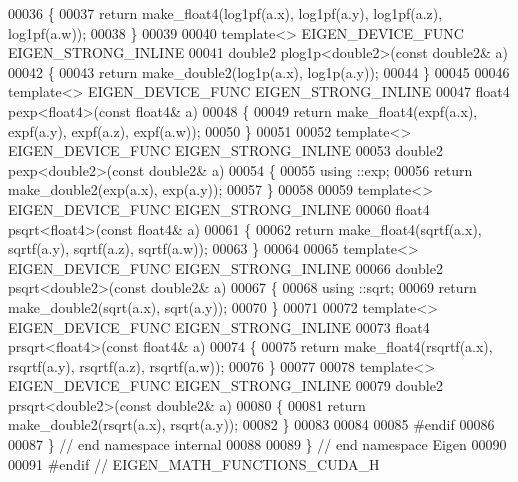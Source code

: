 \begin{DoxyCode}
00036 \{
00037   \textcolor{keywordflow}{return} make\_float4(log1pf(a.x), log1pf(a.y), log1pf(a.z), log1pf(a.w));
00038 \}
00039 
00040 \textcolor{keyword}{template}<>  EIGEN\_DEVICE\_FUNC EIGEN\_STRONG\_INLINE
00041 double2 plog1p<double2>(\textcolor{keyword}{const} double2& a)
00042 \{
00043   \textcolor{keywordflow}{return} make\_double2(log1p(a.x), log1p(a.y));
00044 \}
00045 
00046 \textcolor{keyword}{template}<> EIGEN\_DEVICE\_FUNC EIGEN\_STRONG\_INLINE
00047 float4 pexp<float4>(\textcolor{keyword}{const} float4& a)
00048 \{
00049   \textcolor{keywordflow}{return} make\_float4(expf(a.x), expf(a.y), expf(a.z), expf(a.w));
00050 \}
00051 
00052 \textcolor{keyword}{template}<> EIGEN\_DEVICE\_FUNC EIGEN\_STRONG\_INLINE
00053 double2 pexp<double2>(\textcolor{keyword}{const} double2& a)
00054 \{
00055   using ::exp;
00056   \textcolor{keywordflow}{return} make\_double2(exp(a.x), exp(a.y));
00057 \}
00058 
00059 \textcolor{keyword}{template}<> EIGEN\_DEVICE\_FUNC EIGEN\_STRONG\_INLINE
00060 float4 psqrt<float4>(\textcolor{keyword}{const} float4& a)
00061 \{
00062   \textcolor{keywordflow}{return} make\_float4(sqrtf(a.x), sqrtf(a.y), sqrtf(a.z), sqrtf(a.w));
00063 \}
00064 
00065 \textcolor{keyword}{template}<> EIGEN\_DEVICE\_FUNC EIGEN\_STRONG\_INLINE
00066 double2 psqrt<double2>(\textcolor{keyword}{const} double2& a)
00067 \{
00068   using ::sqrt;
00069   \textcolor{keywordflow}{return} make\_double2(sqrt(a.x), sqrt(a.y));
00070 \}
00071 
00072 \textcolor{keyword}{template}<> EIGEN\_DEVICE\_FUNC EIGEN\_STRONG\_INLINE
00073 float4 prsqrt<float4>(\textcolor{keyword}{const} float4& a)
00074 \{
00075   \textcolor{keywordflow}{return} make\_float4(rsqrtf(a.x), rsqrtf(a.y), rsqrtf(a.z), rsqrtf(a.w));
00076 \}
00077 
00078 \textcolor{keyword}{template}<> EIGEN\_DEVICE\_FUNC EIGEN\_STRONG\_INLINE
00079 double2 prsqrt<double2>(\textcolor{keyword}{const} double2& a)
00080 \{
00081   \textcolor{keywordflow}{return} make\_double2(rsqrt(a.x), rsqrt(a.y));
00082 \}
00083 
00084 
00085 \textcolor{preprocessor}{#endif}
00086 
00087 \} \textcolor{comment}{// end namespace internal}
00088 
00089 \} \textcolor{comment}{// end namespace Eigen}
00090 
00091 \textcolor{preprocessor}{#endif // EIGEN\_MATH\_FUNCTIONS\_CUDA\_H}
\end{DoxyCode}
